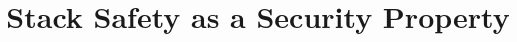 \documentclass[acmsmall,review,anonymous]{acmart}\settopmatter{printfolios=true,printccs=false,printacmref=false}
\begin{document}
\title{Stack Safety as a Security Property}         %



%
\end{document}
